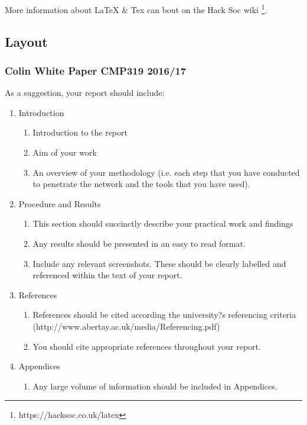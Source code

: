 \documentclass[12pt,a4paper]{article}
\begin{document}
		More information about LaTeX \& Tex can bout on the Hack Soc wiki \footnote{https://hacksoc.co.uk/latex}.
			
		\subsection{Layout}
			\subsubsection{Colin White Paper CMP319 2016/17}
				As a suggestion, your report should include:
				\begin{enumerate}
					\item{Introduction}
						\begin{enumerate}
							\item{Introduction to the report}
							\item{Aim of your work}
							\item{An overview of your methodology (i.e. each step that you have conducted to penetrate the network and the tools that you have used).}
						\end{enumerate}
					\item{Procedure and Results}
						\begin{enumerate}
							\item{This section should succinctly describe your practical work and findings}
							\item{Any results should be presented in an easy to read format.}
							\item{Include any relevant screenshots. These should be clearly labelled and referenced within the text of your report.}
						\end{enumerate}
					\item{References}
						\begin{enumerate}
							\item{References should be cited according the university?s referencing criteria (http://www.abertay.ac.uk/media/Referencing.pdf)} 
							\item{You should cite appropriate references throughout your report.}
						\end{enumerate}
					\item{Appendices}
						\begin{enumerate}
							\item{Any large volume of information should be included in Appendices.}
						\end{enumerate}
				\end{enumerate}
\end{document}
